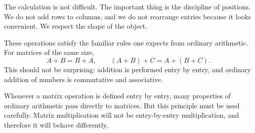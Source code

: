 The calculation is not difficult. The important thing is the discipline of positions. We do not add rows to columns, and we do not rearrange entries because it looks convenient. We respect the shape of the object.

These operations satisfy the familiar rules one expects from ordinary arithmetic. For matrices of the same size,
\[
A+B=B+A,
\qquad
(A+B)+C=A+(B+C).
\]
This should not be surprising: addition is performed entry by entry, and ordinary addition of numbers is commutative and associative.

\begin{remarkbox}
Whenever a matrix operation is defined entry by entry, many properties of ordinary arithmetic pass directly to matrices. But this principle must be used carefully. Matrix multiplication will not be entry-by-entry multiplication, and therefore it will behave differently.
\end{remarkbox}
